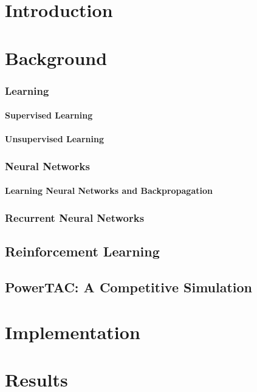 \chapter{Introduction}



\chapter{Background}


\subsection{Learning}

\subsubsection{Supervised Learning}

\subsubsection{Unsupervised Learning}

\subsection{Neural Networks}%
\label{sec:neural_networks}

\subsubsection{Learning Neural Networks and Backpropagation}
\label{sec:Backpropagation}


\subsection{Recurrent Neural Networks}%
\label{sec:recurrent_neural_networks}


\section{Reinforcement Learning}




\section{PowerTAC: A Competitive Simulation}


\chapter{Implementation}


\chapter{Results}


